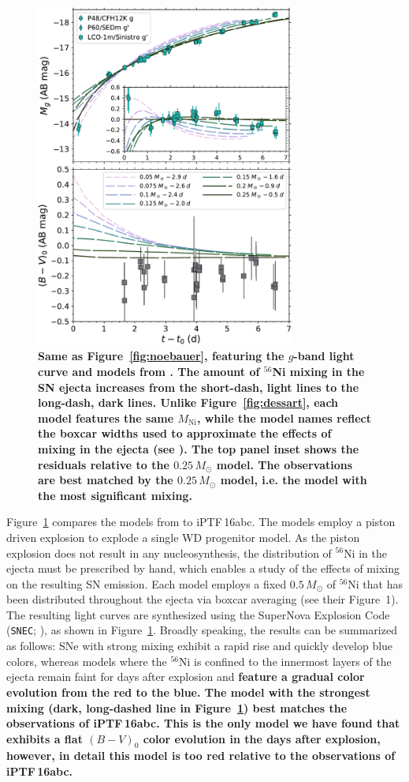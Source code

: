 \documentclass[twocolumn]{aastex61}
\newcommand{\sm}{M_\odot}
\newcommand{\abc}{iPTF\,16abc}
\begin{document}
\begin{figure}[]
  \centering
  \includegraphics[width=3.35in]{compare_Piro.pdf}
  \caption{
  \textbf{Same as Figure~\ref{fig:noebauer}, featuring the $g$-band light
  curve and models from \citet{2016ApJ...826...96P}. The amount of $^{56}$Ni
  mixing in the SN ejecta increases from the short-dash, light lines to the
  long-dash, dark lines. Unlike Figure~\ref{fig:dessart}, each model features
  the same $M_\mathrm{Ni}$, while the model names reflect the boxcar widths
  used to approximate the effects of mixing in the ejecta (see
  \citealt{2016ApJ...826...96P}). The top panel inset shows the residuals
  relative to the $0.25\,M_\odot$ model. The observations are best matched by
  the $0.25\,M_\odot$ model, i.e. the model with the most significant mixing.}}
  \label{fig:piro}
\end{figure}

Figure~\ref{fig:piro} compares the models from \citet{2016ApJ...826...96P} to
\abc. The \citeauthor{2016ApJ...826...96P} models employ a piston driven
explosion to explode a single WD progenitor model. As the piston explosion
does not result in any nucleosynthesis, the distribution of $^{56}$Ni in the
ejecta must be prescribed by hand, which enables a study of the effects of
mixing on the resulting SN emission. Each model employs a fixed $0.5\,\sm$ of
$^{56}$Ni that has been distributed throughout the ejecta via boxcar averaging
(see their Figure~1). The resulting light curves are synthesized using the
SuperNova Explosion Code (\texttt{SNEC}; \citealt{2015ApJ...814...63M}), as
shown in Figure~\ref{fig:piro}. Broadly speaking, the results can be
summarized as follows: SNe with strong mixing exhibit a rapid rise and quickly
develop blue colors, whereas models where the $^{56}$Ni is confined to the
innermost layers of the ejecta remain faint for days after explosion and
\textbf{feature a gradual color evolution from the red to the blue. The model
with the strongest mixing (dark, long-dashed line in Figure~\ref{fig:piro})
best matches the observations of \abc. This is the only model we have found
that exhibits a flat $(B-V)_0$ color evolution in the days after explosion,
however, in detail this model is too red relative to the observations of \abc.
}
\end{document}
